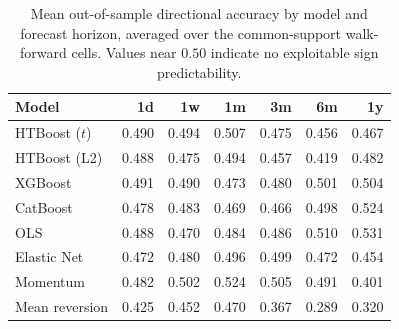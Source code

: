 \begin{table}[htbp]
\centering
\caption{Mean out-of-sample directional accuracy by model and forecast horizon, averaged over the common-support walk-forward cells. Values near $0.50$ indicate no exploitable sign predictability.}
\label{tab:oos_diracc_horizon}
\footnotesize
\begin{tabular}{lrrrrrr}
\toprule
Model & 1d & 1w & 1m & 3m & 6m & 1y \\
\midrule
HTBoost ($t$) & 0.490 & 0.494 & 0.507 & 0.475 & 0.456 & 0.467 \\
HTBoost (L2) & 0.488 & 0.475 & 0.494 & 0.457 & 0.419 & 0.482 \\
XGBoost & 0.491 & 0.490 & 0.473 & 0.480 & 0.501 & 0.504 \\
CatBoost & 0.478 & 0.483 & 0.469 & 0.466 & 0.498 & 0.524 \\
OLS & 0.488 & 0.470 & 0.484 & 0.486 & 0.510 & 0.531 \\
Elastic Net & 0.472 & 0.480 & 0.496 & 0.499 & 0.472 & 0.454 \\
Momentum & 0.482 & 0.502 & 0.524 & 0.505 & 0.491 & 0.401 \\
Mean reversion & 0.425 & 0.452 & 0.470 & 0.367 & 0.289 & 0.320 \\
\bottomrule
\end{tabular}
\end{table}
